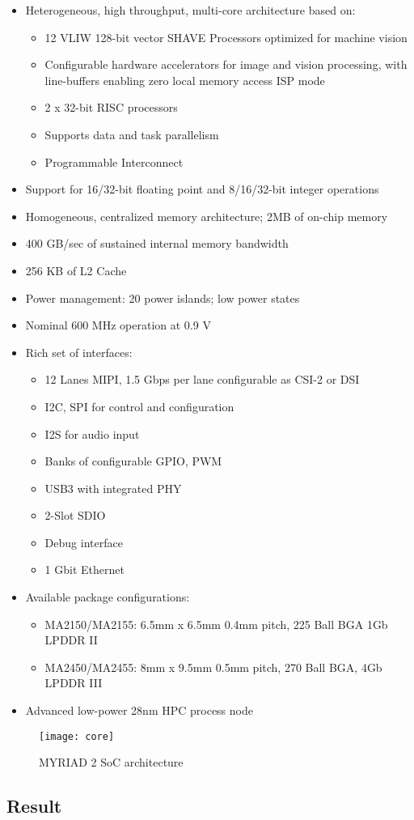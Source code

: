 \begin{itemize}
	\item Heterogeneous, high throughput, multi-core architecture based on:
	\begin{itemize}
		\item  12 VLIW 128-bit vector SHAVE Processors optimized for machine vision
		\item  Configurable hardware accelerators for image and vision processing, with line-buffers enabling zero local memory access ISP mode
		\item 2 x 32-bit RISC processors 
		\item Supports data and task parallelism 
		\item Programmable Interconnect
		\end{itemize}
		\item  Support for 16/32-bit floating point and 8/16/32-bit integer operations
		\item  Homogeneous, centralized memory architecture; 2MB of on-chip memory
		\item  400 GB/sec of sustained internal memory bandwidth
		\item  256 KB of L2 Cache
		\item  Power management: 20 power islands; low power states
		\item  Nominal 600 MHz operation at 0.9 V
		\item  Rich set of interfaces:
		\begin{itemize}
			\item  12 Lanes MIPI, 1.5 Gbps per lane configurable as CSI-2 or DSI
			\item  I2C, SPI for control and configuration
			\item  I2S for audio input
			\item  Banks of configurable GPIO, PWM
			\item  USB3 with integrated PHY
			\item  2-Slot SDIO
			\item  Debug interface
			\item  1 Gbit Ethernet
		\end{itemize}
		\item  Available package configurations:
		\begin{itemize}
			\item  MA2150/MA2155: 6.5mm x 6.5mm 0.4mm pitch, 225 Ball BGA 1Gb LPDDR II
			\item  MA2450/MA2455: 8mm x 9.5mm 0.5mm pitch, 270 Ball BGA, 4Gb LPDDR III
		\end{itemize}
		\item  Advanced low-power 28nm HPC process node
\end{itemize}
%
\begin{figure}[htb]
\centering
\texttt{[image: core]}
\caption{MYRIAD 2 SoC architecture}
\label{fig:movidius}
\end{figure}
%
\subsection{Result}
\label{subsection:result}